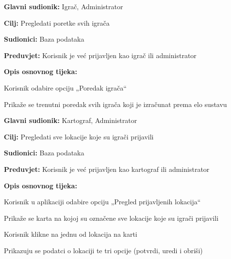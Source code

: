 \noindent {}
\begin{packed_item}
	
	\item \textbf{Glavni sudionik: }Igrač, Administrator
	\item  \textbf{Cilj:} Pregledati poretke svih igrača
	\item  \textbf{Sudionici:} Baza podataka
	\item  \textbf{Preduvjet:} Korisnik je već prijavljen kao igrač ili administrator
	\item  \textbf{Opis osnovnog tijeka:}
	
	\item[] \begin{packed_enum}
		
		\item Korisnik odabire opciju „Poredak igrača“
		\item Prikaže se trenutni poredak svih igrača koji je izračunat prema elo sustavu
	\end{packed_enum}
\end{packed_item}

\noindent {}
\begin{packed_item}
	
	\item \textbf{Glavni sudionik: }Kartograf, Administrator
	\item  \textbf{Cilj:} Pregledati sve lokacije koje su igrači prijavili
	\item  \textbf{Sudionici:} Baza podataka
	\item  \textbf{Preduvjet:} Korisnik je već prijavljen kao kartograf ili administrator
	\item  \textbf{Opis osnovnog tijeka:}
	
	\item[] \begin{packed_enum}
		
		\item Korisnik u aplikaciji odabire opciju „Pregled prijavljenih lokacija“
		\item Prikaže se karta na kojoj su označene sve lokacije koje su igrači prijavili
		\item Korisnik klikne na jednu od lokacija na karti
		\item Prikazuju se podatci o lokaciji te tri opcije (potvrdi, uredi i obriši)
	\end{packed_enum}
\end{packed_item}

